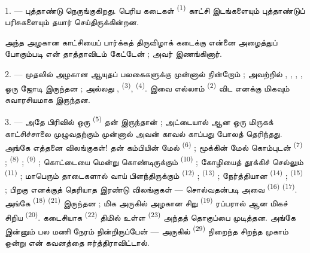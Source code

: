 \VUsaut{4.0mm}
\VUsaut{2.0mm}
\VUsaut{3.4mm}

1. --- புத்தாண்டு நெருங்குகிறது. பெரிய கடைகள்  \textsuperscript{(1)} காட்சி இடங்களையும் புத்தாண்டுப்
பரிசுகளையும் தயார் செய்திருக்கின்றன.

அந்த அழகான காட்சியைப் பார்க்கத் திருவிழாக் கடைக்கு என்னை அழைத்துப்
போகும்படி என் தாத்தாவிடம் கேட்டேன் ; அவர் இணங்கினார்.

2. --- முதலில் அழகான ஆயுதப் பலகைகளுக்கு முன்னால் நின்றோம் ; அவற்றில்
, ,
, , ஒரு ஜோடி
 இருந்தன ; அல்லது ,
 \textsuperscript{(3)},  \textsuperscript{(4)}. இவை எல்லாம்  \textsuperscript{(2)} விட எனக்கு மிகவும் சுவாரசியமாக
இருந்தன.

\VUsaut{3.0mm}
\VUsaut{2.6mm}

3. --- அதே பிரிவில் ஒரு  \textsuperscript{(5)} தன்
 இருந்தான் ; அட்டையால் ஆன ஒரு
மிருகக் காட்சிச்சாலை முழுவதற்கும் முன்னால் அவன் காவல்
காப்பது போலத் தெரிந்தது. அங்கே எத்தனை விலங்குகள்! தன் கம்பியின்
மேல்  \textsuperscript{(6)} ; மூக்கின் மேல் கொம்புடன்
 \textsuperscript{(7)} ; 
\textsuperscript{(8)} ;  \textsuperscript{(9)} ;
கொட்டையை மென்று கொண்டிருக்கும் 
\textsuperscript{(10)} ; கோழியைத் தூக்கிச் செல்லும் 
\textsuperscript{(11)} ; மாபெரும் தாடைகளால் வாய் பிளந்திருக்கும்
 \textsuperscript{(12)} ; 
\textsuperscript{(13)} ; நேர்த்தியான 
\textsuperscript{(14)} ;  \textsuperscript{(15)} ;
பிறகு எனக்குத் தெரியாத இரண்டு விலங்குகள் — சொல்வதன்படி அவை
 \textsuperscript{(16)} 
\textsuperscript{(17)}. அங்கே 
\textsuperscript{(18)}  \textsuperscript{(21)}
இருந்தன ; மிக அருகில் அழகான சிறு 
\textsuperscript{(19)} ரப்பரால் ஆன மிகச் சிறிய 
\textsuperscript{(20)}. கடைசியாக 
\textsuperscript{(22)} திமில் உள்ள 
\textsuperscript{(23)} அந்தத் தொகுப்பை முடித்தன. அங்கே இன்னும் பல
மணி நேரம் நின்றிருப்பேன் — அருகில் 
\textsuperscript{(29)} நிறைந்த சிறந்த முகாம் ஒன்று என் கவனத்தை
ஈர்த்திராவிட்டால்.

